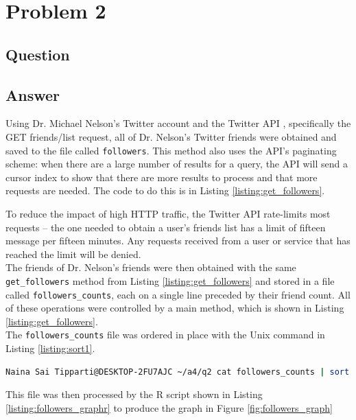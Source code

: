 \section{Problem 2}

\subsection{Question}
\vspace*{10pt}


\subsection{Answer}
Using Dr. Michael Nelson's Twitter account and the Twitter API \cite{api:twitter}, specifically the GET friends/list \cite{api:twitter_followerslist} request, all of Dr. Nelson's Twitter friends were obtained and saved to the file called {\tt followers}. This method also uses the API's paginating scheme: when there are a large number of results for a query, the API will send a cursor index to show that there are more results to process and that more requests are needed. The code to do this is in Listing \ref{listing:get_followers}. 



\clearpage
To reduce the impact of high HTTP traffic, the Twitter API rate-limits most requests -- the one needed to obtain a user's friends list has a limit of fifteen message per fifteen minutes. Any requests received from a user or service that has reached the limit will be denied.
\\
The friends of Dr. Nelson's friends were then obtained with the same {\tt get\_followers} method from Listing \ref{listing:get_followers} and stored in a file called {\tt followers\_counts}, each on a single line preceded by their friend count. All of these operations were controlled by a main method, which is shown in Listing \ref{listing:get_followers}.
\\
The {\tt followers\_counts} file was ordered in place with the Unix command in Listing \ref{listing:sort1}. 
\vspace{2mm}
\begin{lstlisting}[language=Bash,caption={Sort command},label=listing:sort1]
Naina Sai Tipparti@DESKTOP-2FU7AJC ~/a4/q2 cat followers_counts | sort -g -o followers_counts
\end{lstlisting}
\vspace{2mm}
This file was then processed by the R script shown in Listing \ref{listing:followers_graphr} to produce the graph in Figure \ref{fig:followers_graph}

